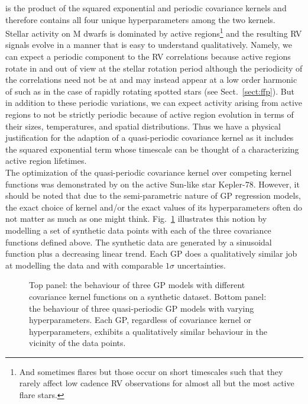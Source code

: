 \noindent is the product of the squared exponential and periodic covariance kernels and therefore
contains all four unique hyperparameters among the two kernels. \\

Stellar activity on M dwarfs
is dominated by active regions\citep{lindegren03}\footnote{And sometimes flares but those
  occur on short timescales such that they rarely affect low cadence RV observations for almost
  all but the most active flare stars.} and the resulting RV signals evolve in a manner that
is easy to understand qualitatively. Namely, we can expect a periodic component to the
RV correlations because active regions rotate in and out of view at the stellar rotation period
although the periodicity of the correlations need not be at \prot{} and may instead appear
at a low order harmonic of \prot{} such as in the case of rapidly rotating spotted stars 
(see Sect.~\ref{sect:ffp}). But in addition to these periodic variations, we can expect activity
arising from active regions to not be strictly periodic because of active region evolution
in terms of their sizes, temperatures, and spatial distributions. Thus we
have a physical justification for the adaption of a
quasi-periodic covariance kernel as it includes the squared exponential term
whose timescale can be thought of a characterizing active region lifetimes. \\

The optimization of the quasi-periodic covariance kernel over competing kernel functions
was demonstrated by \cite{grunblatt15} on the active Sun-like star Kepler-78. However, it
should be noted that due to the semi-parametric nature of GP regression models, the exact
choice of kernel and/or the exact values of its hyperparameters often do not matter as
much as one might think. Fig.~\ref{fig:exactgp} illustrates this notion by modelling a
set of synthetic data points with each of the three covariance functions defined above.
The synthetic data are generated by a sinusoidal function plus a decreasing linear trend. 
Each GP does a qualitatively similar job at modelling the data and with comparable $1\sigma$
uncertainties. \\

\begin{figure}
  \centering
  \caption[Behaviour of GPs with different covariance kernels and hyperparameters.]
          {Top panel: the behaviour of three GP models with different covariance
            kernel functions on a synthetic dataset. Bottom panel: the behaviour of three
            quasi-periodic GP models with varying hyperparameters. Each GP, regardless of
            covariance kernel or hyperparameters, exhibits
            a qualitatively similar behaviour in the vicinity of the data points.}
          \label{fig:exactgp}
\end{figure}
  
